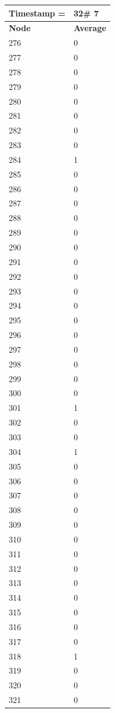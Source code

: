 \begin{tabular}{|l||l|}
\hline
\textbf{Timestamp =} & \textbf{32}\# 7\\\hline
	\textbf{Node} & \textbf{Average} \\ \hline
\hline
	276 & 0 \\ \hline
	277 & 0 \\ \hline
	278 & 0 \\ \hline
	279 & 0 \\ \hline
	280 & 0 \\ \hline
	281 & 0 \\ \hline
	282 & 0 \\ \hline
	283 & 0 \\ \hline
	284 & 1 \\ \hline
	285 & 0 \\ \hline
	286 & 0 \\ \hline
	287 & 0 \\ \hline
	288 & 0 \\ \hline
	289 & 0 \\ \hline
	290 & 0 \\ \hline
	291 & 0 \\ \hline
	292 & 0 \\ \hline
	293 & 0 \\ \hline
	294 & 0 \\ \hline
	295 & 0 \\ \hline
	296 & 0 \\ \hline
	297 & 0 \\ \hline
	298 & 0 \\ \hline
	299 & 0 \\ \hline
	300 & 0 \\ \hline
	301 & 1 \\ \hline
	302 & 0 \\ \hline
	303 & 0 \\ \hline
	304 & 1 \\ \hline
	305 & 0 \\ \hline
	306 & 0 \\ \hline
	307 & 0 \\ \hline
	308 & 0 \\ \hline
	309 & 0 \\ \hline
	310 & 0 \\ \hline
	311 & 0 \\ \hline
	312 & 0 \\ \hline
	313 & 0 \\ \hline
	314 & 0 \\ \hline
	315 & 0 \\ \hline
	316 & 0 \\ \hline
	317 & 0 \\ \hline
	318 & 1 \\ \hline
	319 & 0 \\ \hline
	320 & 0 \\ \hline
	321 & 0 \\ \hline
\end{tabular}
